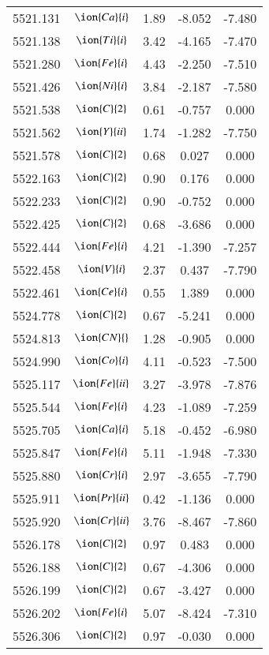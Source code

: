\documentclass[fleqn,usenatbib]{mnras}
\begin{document}
\begin{center}
\begin{table}
\begin{tabular}{ccccc}
5521.131 &  $\ion{Ca}{i}$  & 1.89 & -8.052 & -7.480 \\ 
5521.138 &  $\ion{Ti}{i}$  & 3.42 & -4.165 & -7.470 \\ 
5521.280 &  $\ion{Fe}{i}$  & 4.43 & -2.250 & -7.510 \\ 
5521.426 &  $\ion{Ni}{i}$  & 3.84 & -2.187 & -7.580 \\ 
5521.538 &  $\ion{C}{2}$ & 0.61 & -0.757 & 0.000 \\ 
5521.562 &  $\ion{Y}{ii}$  & 1.74 & -1.282 & -7.750 \\ 
5521.578 &  $\ion{C}{2}$ & 0.68 & 0.027 & 0.000 \\ 
5522.163 &  $\ion{C}{2}$ & 0.90 & 0.176 & 0.000 \\ 
5522.233 &  $\ion{C}{2}$ & 0.90 & -0.752 & 0.000 \\ 
5522.425 &  $\ion{C}{2}$ & 0.68 & -3.686 & 0.000 \\ 
5522.444 &  $\ion{Fe}{i}$  & 4.21 & -1.390 & -7.257 \\ 
5522.458 &  $\ion{V}{i}$  & 2.37 & 0.437 & -7.790 \\ 
5522.461 &  $\ion{Ce}{i}$  & 0.55 & 1.389 & 0.000 \\ 
5524.778 &  $\ion{C}{2}$ & 0.67 & -5.241 & 0.000 \\ 
5524.813 & $\ion{CN}{}$ & 1.28 & -0.905 & 0.000 \\ 
5524.990 &  $\ion{Co}{i}$  & 4.11 & -0.523 & -7.500 \\ 
5525.117 &  $\ion{Fe}{ii}$  & 3.27 & -3.978 & -7.876 \\ 
5525.544 &  $\ion{Fe}{i}$  & 4.23 & -1.089 & -7.259 \\ 
5525.705 &  $\ion{Ca}{i}$  & 5.18 & -0.452 & -6.980 \\ 
5525.847 &  $\ion{Fe}{i}$  & 5.11 & -1.948 & -7.330 \\ 
5525.880 &  $\ion{Cr}{i}$  & 2.97 & -3.655 & -7.790 \\ 
5525.911 &  $\ion{Pr}{ii}$  & 0.42 & -1.136 & 0.000 \\ 
5525.920 &  $\ion{Cr}{ii}$  & 3.76 & -8.467 & -7.860 \\ 
5526.178 &  $\ion{C}{2}$ & 0.97 & 0.483 & 0.000 \\ 
5526.188 &  $\ion{C}{2}$ & 0.67 & -4.306 & 0.000 \\ 
5526.199 &  $\ion{C}{2}$ & 0.67 & -3.427 & 0.000 \\ 
5526.202 &  $\ion{Fe}{i}$  & 5.07 & -8.424 & -7.310 \\ 
5526.306 &  $\ion{C}{2}$ & 0.97 & -0.030 & 0.000 \\ 

\end{tabular}
\end{table}
\end{center}
\end{document}
